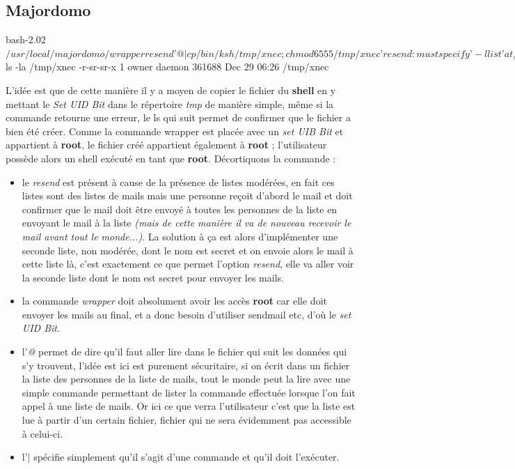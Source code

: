 \documentclass{article}
\newcommand{\titre}[1]{\textcolor{title}{#1}}
\newcommand{\tssect}[1]{\titre{\subsection{#1}}}
\newcommand{\term}[1]{\textit{\textcolor{maintitle}{#1}}}
\begin{document}
\begin{sffamily}
\tssect{Majordomo}

\begin{center}
	\begin{boxedverbatim}
bash-2.02$ /usr/local/majordomo/wrapper resend ’@|cp /bin/ksh
/tmp/xnec;chmod 6555 /tmp/xnec’
resend: must specify ’-l list’ at /usr/local/majordomo/resend line 77.
bash-2.02$ ls -la /tmp/xnec
-r-sr-sr-x 1 owner daemon 361688 Dec 29 06:26 /tmp/xnec
	\end{boxedverbatim}
\end{center}

L'idée est que de cette manière il y a moyen de copier le fichier du \textbf{shell} en y mettant le \term{Set UID Bit}
dans le répertoire \textit{tmp} de manière simple, même si la commande retourne une erreur, le ls qui suit permet de
confirmer que le fichier a bien été créer. Comme la commande wrapper est placée avec un \term{set UIB Bit} et 
appartient à \textbf{root}, le fichier créé appartient également à \textbf{root} ; l'utilisateur possède alors un 
shell exécuté en tant que \textbf{root}. Décortiquons la commande :
\begin{itemize}
\item le \term{resend} est présent à cause de la présence de listes modérées, en fait ces listes sont des listes de 
mails mais une personne reçoit d'abord le mail et doit confirmer que le mail doit être envoyé à toutes les personnes de 
la liste en envoyant le mail à la liste \textit{(mais de cette manière il va de nouveau recevoir le mail avant tout le 
monde...)}. La solution à ça est alors d'implémenter une seconde liste, non modérée, dont le nom est secret et on 
envoie alors le mail à cette liste là, c'est exactement ce que permet l'option \term{resend}, elle va aller voir la 
seconde liste dont le nom est secret pour envoyer les mails.
\item la commande \term{wrapper} doit absolument avoir les accès \textbf{root} car elle doit envoyer les mails au 
final, et a donc besoin d'utiliser sendmail etc, d'où le \term{set UID Bit}.
\item l'\term{@} permet de dire qu'il faut aller lire dans le fichier qui suit les données qui s'y trouvent, l'idée est 
ici est purement sécuritaire, si on écrit dans un fichier la liste des personnes de la liste de mails, tout le monde 
peut la lire avec une simple commande permettant de lister la commande effectuée lorsque l'on fait appel à une liste de 
mails. Or ici ce que verra l'utilisateur c'est que la liste est lue à partir d'un certain fichier, fichier qui ne sera 
évidemment pas accessible à celui-ci.
\item l'\term{$|$} spécifie simplement qu'il s'agit d'une commande et qu'il doit l'exécuter.
\end{itemize}


\end{sffamily}
\end{document}
